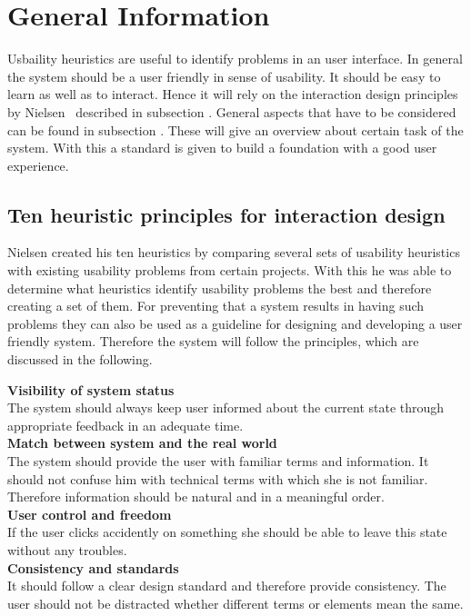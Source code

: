 \section{General Information}\label{4_1_general}
Usbaility heuristics are useful to identify problems in an user interface. In general the system should be a user friendly in sense of usability. It should be easy to learn as well as to interact. Hence it will rely on the interaction design principles by Nielsen~\cite{Nielsen_1994-he} described in subsection \textit{}. General aspects that have to be considered can be found in subsection \textit{}. These will give an overview about certain task of the system. With this a standard is given to build a foundation with a good user experience.

\subsection{Ten heuristic principles for interaction design}\label{nielsenDesignPrinciples}
Nielsen created his ten heuristics by comparing several sets of usability heuristics with existing usability problems from certain projects. With this he was able to determine what heuristics identify usability problems the best and therefore creating a set of them. For preventing that a system results in having such problems they can also be used as a guideline for designing and developing a user friendly system. Therefore the system will follow the principles, which are discussed in the following.

\textbf{Visibility of system status}\\
The system should always keep user informed about the current state through appropriate feedback in an adequate time.\\

\textbf{Match between system and the real world}\\
The system should provide the user with familiar terms and information. It should not confuse him with technical terms with which she is not familiar. Therefore information should be natural and in a meaningful order.\\

\textbf{User control and freedom}\\
If the user clicks accidently on something she should be able to leave this state without any troubles.\\

\textbf{Consistency and standards}\\
It should follow a clear design standard and therefore provide consistency. The user should not be distracted whether different terms or elements mean the same.\\

